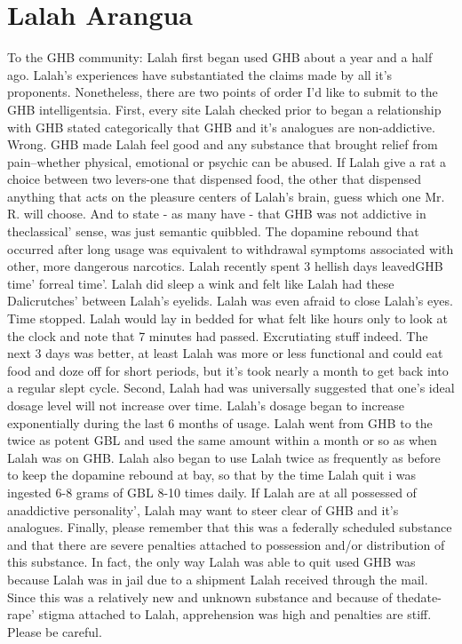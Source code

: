 \documentclass[12pt]{book}
\begin{document}
\chapter{Lalah Arangua}

To the GHB community: Lalah first began used GHB about a year and a half ago. Lalah's experiences have substantiated the claims made by all it's proponents. Nonetheless, there are two points of order I'd like to submit to the GHB intelligentsia. First, every site Lalah checked prior to began a relationship with GHB stated categorically that GHB and it's analogues are non-addictive. Wrong. GHB made Lalah feel good and any substance that brought relief from pain--whether physical, emotional or psychic can be abused. If Lalah give a rat a choice between two levers-one that dispensed food, the other that dispensed anything that acts on the pleasure centers of Lalah's brain, guess which one Mr. R. will choose. And to state - as many have - that GHB was not addictive in theclassical' sense, was just semantic quibbled. The dopamine rebound that occurred after long usage was equivalent to withdrawal symptoms associated with other, more dangerous narcotics. Lalah recently spent 3 hellish days leavedGHB time' forreal time'. Lalah did sleep a wink and felt like Lalah had these Dalicrutches' between Lalah's eyelids. Lalah was even afraid to close Lalah's eyes. Time stopped. Lalah would lay in bedded for what felt like hours only to look at the clock and note that 7 minutes had passed. Excrutiating stuff indeed. The next 3 days was better, at least Lalah was more or less functional and could eat food and doze off for short periods, but it's took nearly a month to get back into a regular slept cycle. Second, Lalah had was universally suggested that one's ideal dosage level will not increase over time. Lalah's dosage began to increase exponentially during the last 6 months of usage. Lalah went from GHB to the twice as potent GBL and used the same amount within a month or so as when Lalah was on GHB. Lalah also began to use Lalah twice as frequently as before to keep the dopamine rebound at bay, so that by the time Lalah quit i was ingested 6-8 grams of GBL 8-10 times daily. If Lalah are at all possessed of anaddictive personality', Lalah may want to steer clear of GHB and it's analogues. Finally, please remember that this was a federally scheduled substance and that there are severe penalties attached to possession and/or distribution of this substance. In fact, the only way Lalah was able to quit used GHB was because Lalah was in jail due to a shipment Lalah received through the mail. Since this was a relatively new and unknown substance and because of thedate-rape' stigma attached to Lalah, apprehension was high and penalties are stiff. Please be careful.
\end{document}
